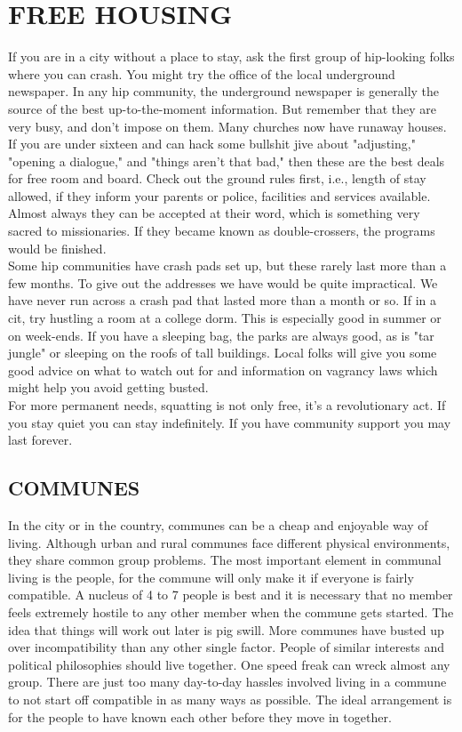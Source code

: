 \documentclass[11pt,twoside,a4paper]{book}
\begin{document}
\section{FREE HOUSING}

If you are in a city without a place to stay, ask the first group of hip-looking folks where you can crash. You might try the office of the local underground newspaper. In any hip community, the underground newspaper is generally the source of the best up-to-the-moment information. But remember that they are very busy, and don't impose on them. Many churches now have runaway houses. If you are under sixteen and can hack some bullshit jive about "adjusting," "opening a dialogue," and "things aren't that bad," then these are the best deals for free room and board. Check out the ground rules first, i.e., length of stay allowed, if they inform your parents or police, facilities and services available. Almost always they can be accepted at their word, which is something very sacred to missionaries. If they became known as double-crossers, the programs would be finished.~\\

Some hip communities have crash pads set up, but these rarely last more than a few months. To give out the addresses we have would be quite impractical. We have never run across a crash pad that lasted more than a month or so. If in a cit, try hustling a room at a college dorm. This is especially good in summer or on week-ends. If you have a sleeping bag, the parks are always good, as is "tar jungle" or sleeping on the roofs of tall buildings. Local folks will give you some good advice on what to watch out for and information on vagrancy laws which might help you avoid getting busted.~\\

For more permanent needs, squatting is not only free, it's a revolutionary act. If you stay quiet you can stay indefinitely. If you have community support you may last forever.

\subsection{COMMUNES}

In the city or in the country, communes can be a cheap and enjoyable way of living. Although urban and rural communes face different physical environments, they share common group problems. The most important element in communal living is the people, for the commune will only make it if everyone is fairly compatible. A nucleus of 4 to 7 people is best and it is necessary that no member feels extremely hostile to any other member when the commune gets started. The idea that things will work out later is pig swill. More communes have busted up over incompatibility than any other single factor. People of similar interests and political philosophies should live together. One speed freak can wreck almost any group. There are just too many day-to-day hassles involved living in a commune to not start off compatible in as many ways as possible. The ideal arrangement is for the people to have known each other before they move in together.~\\
\end{document}
